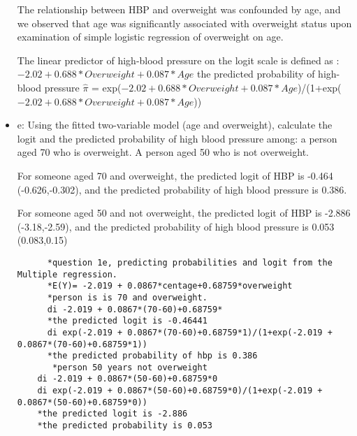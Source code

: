 \documentclass{article}
\begin{document}
\begin{itemize}
      The relationship between HBP and overweight was confounded by age, and we observed that age was significantly associated with overweight status upon examination of simple logistic regression of overweight on age.  
      
      The linear predictor of high-blood pressure on the logit scale is defined as :$-2.02+ 0.688*Overweight +0.087*Age$
      the predicted probability of high-blood pressure $\hat{\pi}$ = exp($-2.02+ 0.688*Overweight +0.087*Age$)/(1+exp($-2.02+ 0.688*Overweight +0.087*Age$))
      
     \item e:  Using the fitted two-variable model (age and overweight), calculate the logit and the predicted probability of high blood pressure among: a person aged 70 who is overweight. A person aged 50 who is not overweight.
     
     For someone aged 70 and overweight, the predicted logit of HBP is -0.464 (-0.626,-0.302), and the predicted probability of high blood pressure is 0.386. 
     
      For someone aged 50 and not overweight, the predicted logit of HBP is -2.886 (-3.18,-2.59), and the predicted probability of high blood pressure is 0.053 (0.083,0.15) 
      \begin{verbatim}
      *question 1e, predicting probabilities and logit from the Multiple regression.
      *E(Y)= -2.019 + 0.0867*centage+0.68759*overweight
      *person is is 70 and overweight.
      di -2.019 + 0.0867*(70-60)+0.68759*
      *the predicted logit is -0.46441
      di exp(-2.019 + 0.0867*(70-60)+0.68759*1)/(1+exp(-2.019 + 0.0867*(70-60)+0.68759*1))
      *the predicted probability of hbp is 0.386
	   *person 50 years not overweight
    di -2.019 + 0.0867*(50-60)+0.68759*0
	di exp(-2.019 + 0.0867*(50-60)+0.68759*0)/(1+exp(-2.019 + 0.0867*(50-60)+0.68759*0))
	*the predicted logit is -2.886
	*the predicted probability is 0.053
      \end{verbatim}
 \end{itemize}
\end{document}
